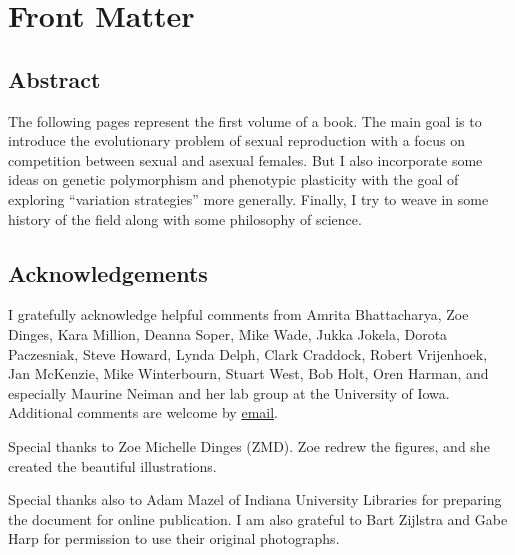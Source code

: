\documentclass[
  american,
  letterpaper,
]{book}
\renewcommand*\contentsname{Table of contents}
\newcommand\contentsname{Table of contents}
\begin{document}

\renewcommand*\contentsname{Contents}
{
\setcounter{tocdepth}{2}
\tableofcontents
}
\listoffigures
\listoftables

\mainmatter
{}

\chapter*{Front Matter}\label{front-matter}


\section*{Abstract}\label{abstract}


The following pages represent the first volume of a book. The main goal
is to introduce the evolutionary problem of sexual reproduction with a
focus on competition between sexual and asexual females. But I also
incorporate some ideas on genetic polymorphism and phenotypic plasticity
with the goal of exploring ``variation strategies'' more generally.
Finally, I try to weave in some history of the field along with some
philosophy of science.

\section*{Acknowledgements}\label{acknowledgements}


I gratefully acknowledge helpful comments from Amrita Bhattacharya, Zoe
Dinges, Kara Million, Deanna Soper, Mike Wade, Jukka Jokela, Dorota
Paczesniak, Steve Howard, Lynda Delph, Clark Craddock, Robert
Vrijenhoek, Jan McKenzie, Mike Winterbourn, Stuart West, Bob Holt, Oren
Harman, and especially Maurine Neiman and her lab group at the
University of Iowa. Additional comments are welcome by
\href{mailto:clively@iu.edu}{email}.

Special thanks to Zoe Michelle Dinges (ZMD). Zoe redrew the figures, and
she created the beautiful illustrations.

Special thanks also to Adam Mazel of Indiana University Libraries for
preparing the document for online publication. I am also grateful to
Bart Zijlstra and Gabe Harp for permission to use their original
photographs.
\end{document}

